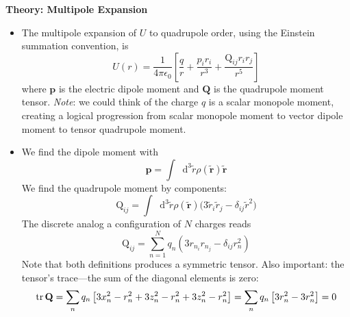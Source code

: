 \documentclass[11pt, a4paper]{article}
\newcommand{\diff}{\mathop{}\!\mathrm{d}} %
\renewcommand{\vec}[1]{\bm{#1}} %
\newcommand{\mat}[1]{\mathbf{#1}} %
\newcommand{\tvec}[1]{\tilde{\vec{#1}}} %
\newcommand{\ee}{\epsilon_{0}}  %
\begin{document}
\textbf{Theory: Multipole Expansion}
\begin{itemize}

	\item The multipole expansion of $ U $ to quadrupole order, using the Einstein summation convention, is
	\begin{equation*}
		U(r) = \frac{1}{4\pi \ee} \left[\frac{q}{r} + \frac{p_{i}r_{i}}{r^{3}} + \frac{\mathrm{Q}_{ij}r_{i}r_{j}}{r^{5}} \right]
	\end{equation*}
	where $ \vec{p} $ is the electric dipole moment and $ \mat{Q} $ is the quadrupole moment tensor. \textit{Note}: we could think of the charge $ q $ is a scalar monopole moment, creating a logical progression from scalar monopole moment to vector dipole moment to tensor quadrupole moment. 
	
	\item We find the dipole moment with 
	\begin{equation*}
		\vec{p} = \int  \diff^{3} \tilde{r} \rho(\tvec{r}) \tvec{r}
	\end{equation*}
	We find the quadrupole moment by components:
	\begin{equation*}
		\mathrm{Q}_{ij} = \int  \diff^{3} \tilde{r} \rho(\tvec{r}) \big( 3\tilde{r}_{i}\tilde{r}_{j} - \delta_{ij}\tilde{r}^{2} \big)
	\end{equation*}
	The discrete analog a configuration of $ N $ charges reads
	\begin{equation*}
		\mathrm{Q}_{ij} = \sum_{n=1}^{N} q_{n} \left(3r_{n_{i}}r_{n_{j}} - \delta_{ij}r_{n}^{2}\right)
	\end{equation*}
	Note that both definitions produces a symmetric tensor. Also important: the tensor's trace---the sum of the diagonal elements is zero:
	\begin{equation*}
		\tr\mat{Q} = \sum_{n} q_{n}\left[3x_{n}^{2} - r_{n}^{2} + 3z_{n}^{2} - r_{n}^{2} + 3z_{n}^{2} - r_{n}^{2} \right] = \sum_{n}q_{n}\left[3r_{n}^{2} - 3r_{n}^{2}\right] = 0
	\end{equation*}
\end{itemize}
\end{document}
